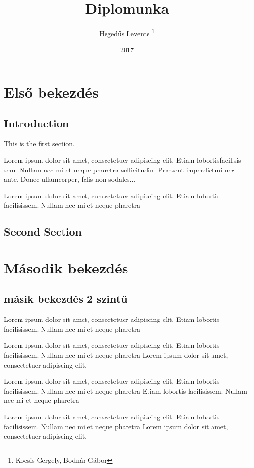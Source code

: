 \documentclass[12pt, a4paper]{book}
\title{Diplomunka}
\author{Hegedűs Levente \thanks{Kocsis Gergely, Bodnár Gábor}}
\date{2017}
\begin{document}
 
\maketitle

\chapter{Első bekezdés}
\section{Introduction}
 
This is the first section.
 
Lorem  ipsum  dolor  sit  amet,  consectetuer  adipiscing  
elit.   Etiam  lobortisfacilisis sem.  Nullam nec mi et 
neque pharetra sollicitudin.  Praesent imperdietmi nec ante. 
Donec ullamcorper, felis non sodales...
 
Lorem ipsum dolor sit amet, consectetuer adipiscing elit.  
Etiam lobortis facilisissem.  Nullam nec mi et neque pharetra  
\section{Second Section}

\chapter{Második bekezdés}

\section{másik bekezdés 2 szintű}
 
Lorem ipsum dolor sit amet, consectetuer adipiscing elit.  
Etiam lobortis facilisissem.  Nullam nec mi et neque pharetra  
 
Lorem ipsum dolor sit amet, consectetuer adipiscing elit.  
Etiam lobortis facilisissem.  Nullam nec mi et neque pharetra Lorem ipsum dolor sit amet, consectetuer adipiscing elit.  
 
Lorem ipsum dolor sit amet, consectetuer adipiscing elit.  
Etiam lobortis facilisissem.  Nullam nec mi et neque pharetra Etiam lobortis facilisissem.  Nullam nec mi et neque pharetra  
 
Lorem ipsum dolor sit amet, consectetuer adipiscing elit.  
Etiam lobortis facilisissem.  Nullam nec mi et neque pharetra Lorem ipsum dolor sit amet, consectetuer adipiscing elit.  
 
\end{document}
